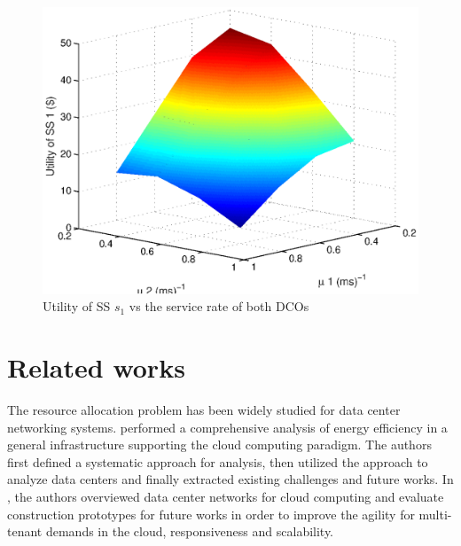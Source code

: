 \documentclass[twocolumn,10pt]{IEEEtran}
\begin{document}
\begin{figure}[!t]
\centering
\includegraphics[scale=0.45, bb=493 253 99 558]{fig_miu_vs_ss.eps}
\caption{Utility of SS $s_1$ vs the service rate of both DCOs}
\label{fig:miu}
\end{figure}


\section{Related works}\label{sec:related}

The resource allocation problem has been widely studied for data center networking systems. \cite{Mastelic01} performed a comprehensive analysis of energy efficiency in a general infrastructure supporting the cloud computing paradigm. The authors first defined a systematic approach for analysis, then utilized the approach to analyze data centers and finally extracted existing challenges and future works. In \cite{Wang01}, the authors overviewed data center networks for cloud computing and evaluate construction prototypes for future works in order to improve the agility for multi-tenant demands in the cloud, responsiveness and scalability.
\end{document}
